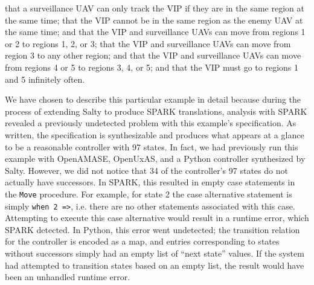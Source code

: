 \documentclass[runningheads]{llncs}
\begin{document}
 that a surveillance UAV can only track the VIP if they are in the same region at the same time; 
 that the VIP cannot be in the same region as the enemy UAV at the same time; 
 and  that the VIP and surveillance UAVs can move from regions 1 or 2 to regions 1, 2, or 3;
 that the VIP and surveillance UAVs can move from region 3 to any other region; 
 and  that the VIP and surveillance UAVs can move from regions 4 or 5 to regions 3, 4, or 5; 
and  that the VIP must go to regions 1 and 5 infinitely often.

We have chosen to describe this particular example in detail because during the process of extending Salty to produce SPARK translations, 
analysis with SPARK revealed a previously undetected problem with this example's specification. 
As written, the specification is synthesizable and produces what appears at a glance to be a reasonable controller with 97 states. 
In fact, we had previously run this example with OpenAMASE, OpenUxAS, and a Python controller synthesized by Salty. 
However, we did not notice that 34 of the controller's 97 states do not actually have successors. 
In SPARK, this resulted in empty case statements in the \lstinline{Move} procedure. 
For example, for state 2 the case alternative statement is simply \lstinline{when 2 =>}, i.e. there are no other statements associated with this case. 
Attempting to execute this case alternative would result in a runtime error, which SPARK detected. 
In Python, this error went undetected; 
the transition relation for the controller is encoded as a map, and entries corresponding to states without successors 
simply had an empty list of ``next state'' values. 
If the system had attempted to transition states based on an empty list, the result would have been an unhandled runtime error. 
\end{document}
